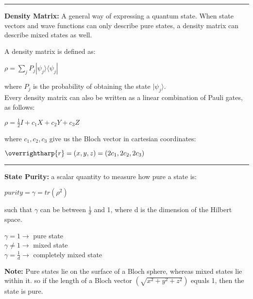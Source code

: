 \documentclass{article}
\begin{document}
\vspace{5pt}
\hrule
\vspace{5pt}

\newpage


\textbf{Density Matrix:} A general way of expressing a quantum state.
When state vectors and wave functions can only describe pure states, a density matrix can describe mixed states as well.

A density matrix is defined as:

\begin{center}
$ \displaystyle \rho = \sum_{j} P_{j}  |{\psi}_{j} \rangle \langle{\psi}_{j} | $
\end{center}
where $P_{j}$ is the probability of obtaining the state $|\psi_{j} \rangle$. \\

Every density matrix can also be written as a linear combination of Pauli gates, as follows:

\begin{center}
$\rho = \frac{1}{2} I + c_{1} X + c_{2}Y + c_{3}Z$ \\
\end{center}

where  $c_{1}, c_{2}, c_{3}$ give us the Bloch vector in cartesian coordinates:
\begin{center}
$\overrightharp{r} = (x, y, z) = (2c_{1}, 2c_{2}, 2c_{3})$
\end{center}


\vspace{5pt}
\hrule 
\vspace{5pt}


\textbf{State Purity:} a scalar quantity to measure how pure a state is:

\begin{center}
$ purity = \gamma = tr(\rho^2) $
\end{center}

such that $\gamma$ can be between $\frac{1}{d}$ and 1, where d is the dimension of the Hilbert space.

\begin{center}
$\gamma = 1 \rightarrow $ pure state \\
$\gamma \ne 1 \rightarrow $ mixed state \\
$\gamma = \frac{1}{d} \rightarrow $  completely mixed state
\end{center}

\textbf{Note:} Pure states lie on the surface of a Bloch sphere, whereas mixed states lie within it. 
so if the length of a Bloch vector $(\sqrt{x^2 + y^2 + z^2} )$ equals 1, then the state is pure. 
\end{document}
